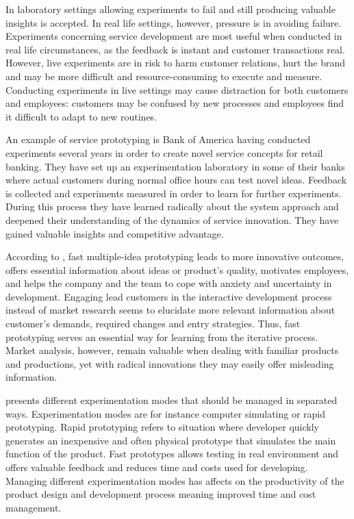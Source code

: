In laboratory settings allowing experiments to fail and still producing valuable insights is accepted. In real life settings, however, pressure is in avoiding failure. Experiments concerning service development are most useful when conducted in real life circumstances, as the feedback is instant and customer transactions real. However, live experiments are in risk to harm customer relations, hurt the brand and may be more difficult and resource-consuming to execute and measure. Conducting experiments in live settings may cause distraction for both customers and employees: customers may be confused by new processes and employees find it difficult to adapt to new routines. \citep{thomke2003r}

An example of service prototyping is Bank of America having conducted experiments several years in order to create novel service concepts for retail banking. They have set up an experimentation laboratory in some of their banks where actual customers during normal office hours can test novel ideas. Feedback is collected and experiments measured in order to learn for further experiments. During this process they have learned radically about the system approach and deepened their understanding of the dynamics of service innovation. They have gained valuable insights and competitive advantage. \citep{thomke2003r}

According to \citet{quinn1985managing}, fast multiple-idea prototyping leads to more innovative outcomes, offers essential information about ideas or product's quality, motivates employees, and helps the company and the team to cope with anxiety and uncertainty in development. Engaging lead customers in the interactive development process instead of market research seems to elucidate more relevant information about customer's demands, required changes and entry strategies. Thus, fast prototyping serves an essential way for learning from the iterative process. Market analysis, however, remain valuable when dealing with familiar products and productions, yet with radical innovations they may easily offer misleading information. \citep{quinn1985managing}

\citet{thomke1998managing} presents different experimentation modes that should be managed in separated ways. Experimentation modes are for instance computer simulating or rapid prototyping. Rapid prototyping refers to situation where developer quickly generates an inexpensive and often physical prototype that simulates the main function of the product. Fast prototypes allows testing in real environment and offers valuable feedback and reduces time and costs used for developing. Managing different experimentation modes has affects on the productivity of the product design and development process meaning improved time and cost management.

